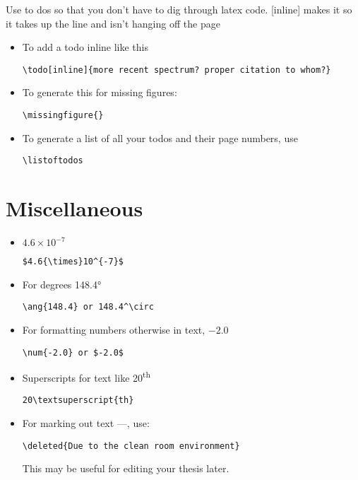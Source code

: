 Use to dos so that you don't have to dig through latex code. [inline] makes it so it takes up the line and isn't hanging off the page
%
\begin{itemize}
\item To add a todo inline like this
\begin{lstlisting}
\todo[inline]{more recent spectrum? proper citation to whom?} 
\end{lstlisting}
%
\item To generate this for missing figures:
\missingfigure{} %
\begin{lstlisting}
\missingfigure{}
\end{lstlisting}
%
\item To generate a list of all your todos and their page numbers, use
\begin{lstlisting}
\listoftodos 
\end{lstlisting}
\end{itemize}



\section{Miscellaneous}

\begin{itemize}
\item  $4.6{\times}10^{-7}$
\begin{lstlisting}
$4.6{\times}10^{-7}$
\end{lstlisting}
\item For degrees \ang{148.4} 
\begin{lstlisting}
\ang{148.4} or 148.4^\circ
\end{lstlisting}
\item For formatting numbers otherwise in text, \num{-2.0}
\begin{lstlisting}
\num{-2.0} or $-2.0$
\end{lstlisting}
\item Superscripts for text like 20\textsuperscript{th}
\begin{lstlisting}
20\textsuperscript{th}
\end{lstlisting}
\item For marking out text ---, use:
\begin{lstlisting}
\deleted{Due to the clean room environment}
\end{lstlisting}
This may be useful for editing your thesis later.
\end{itemize}

